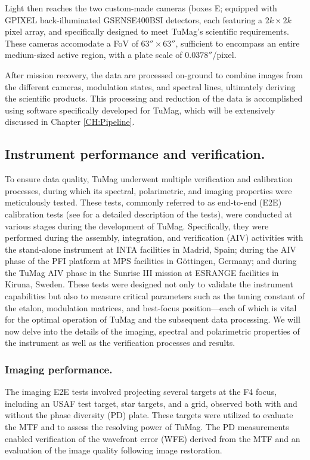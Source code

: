 Light then reaches the two custom-made cameras (boxes E; \citealt{tumag-cams} equipped with GPIXEL back-illuminated GSENSE400BSI detectors, each featuring a $2k \times 2k$ pixel array, and specifically designed to meet TuMag's scientific requirements. These cameras accomodate a FoV of $63'' \times 63''$, sufficient to encompass an entire medium-sized active region, with a plate scale of $0.0378''$/pixel.

After mission recovery, the data are processed on-ground to combine images from the different cameras, modulation states, and spectral lines, ultimately deriving the scientific products. This processing and reduction of the data is accomplished using software specifically developed for TuMag, which will be extensively discussed in Chapter \ref{CH:Pipeline}. 

\subsection{Instrument performance and verification.}

To ensure data quality, TuMag underwent multiple verification and calibration processes, during which its spectral, polarimetric, and imaging properties were meticulously tested. These tests, commonly referred to as end-to-end (E2E) calibration tests (see \cite{e2e-tests-inta} for a detailed description of the tests), were conducted at various stages during the development of TuMag. Specifically, they were performed during the assembly, integration, and verification (AIV) activities with the stand-alone instrument at INTA facilities in Madrid, Spain; during the AIV phase of the PFI platform at MPS facilities in Göttingen, Germany; and during the TuMag AIV phase in the Sunrise III mission at ESRANGE facilities in Kiruna, Sweden. These tests were designed not only to validate the instrument capabilities but also to measure critical parameters such as the tuning constant of the etalon, modulation matrices, and best-focus position—each of which is vital for the optimal operation of TuMag and the subsequent data processing. We will now delve into the details of the imaging, spectral and polarimetric properties of the instrument as well as the verification processes and results.

\subsubsection{Imaging performance.}

The imaging E2E tests involved projecting several targets at the F4 focus, including an USAF test target, star targets, and a grid, observed both with and without the phase diversity (PD) plate. These targets were utilized to evaluate the MTF and to assess the resolving power of TuMag. The PD measurements enabled verification of the wavefront error (WFE) derived from the MTF and an evaluation of the image quality following image restoration. 

